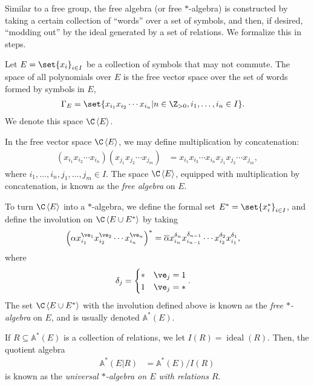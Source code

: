 Similar to a free group, the free algebra (or free $\ast$-algebra) is constructed by taking a certain collection of ``words'' over a set of symbols, and then, if desired, ``modding out'' by the ideal generated by a set of relations. We formalize this in steps.
\begin{definition}\label{def:free_algebra}
  Let $E=\set{x_i}_{i\in I}$ be a collection of symbols that may not commute. The space of all polynomials over $E$ is the free vector space over the set of words formed by symbols in $E$,
  \begin{align*}
    \Gamma_E &= \set{x_{i_1}x_{i_2}\cdots x_{i_n} | n\in\N,i_1,\dots,i_n\in I}.
  \end{align*}
  We denote this space $\C \left\langle E \right\rangle$.\newline

  In the free vector space $\C \left\langle E \right\rangle$, we may define multiplication by concatenation:
  \begin{align*}
    \left(x_{i_1}x_{i_2}\cdots x_{i_n}\right)\left(x_{j_1}x_{j_2}\cdots x_{j_m}\right) &= x_{i_1}x_{i_2}\cdots x_{i_n}x_{j_1}x_{j_2}\cdots x_{j_m},
  \end{align*}
  where $i_1,\dots,i_n,j_1,\dots,j_m\in I$. The space $\C\left\langle E \right\rangle$, equipped with multiplication by concatenation, is known as the \textit{free algebra} on $E$.\newline

  To turn $\C\left\langle E \right\rangle$ into a $\ast$-algebra, we define the formal set $E^{\ast} = \set{x_{i}^{\ast}}_{i\in I}$, and define the involution on $\C\left\langle E\cup E^{\ast} \right\rangle$ by taking
  \begin{align*}
    \left(\alpha x_{i_1}^{\ve_1}x_{i_2}^{\ve_2}\cdots x_{i_n}^{\ve_n}\right)^{\ast} &= \overline{\alpha}x_{i_n}^{\delta_n}x_{i_{n-1}}^{\delta_{n-1}}\cdots x_{i_2}^{\delta_2}x_{i_1}^{\delta_1},
  \end{align*}
  where
  \begin{align*}
    \delta_j &= \begin{cases}
      \ast & \ve_j = 1\\
      1 & \ve_j = \ast
    \end{cases}.
  \end{align*}
  The set $\C\left\langle E\cup E^{\ast} \right\rangle$ with the involution defined above is known as the \textit{free $\ast$-algebra} on $E$, and is usually denoted $\mathbb{A}^{\ast}\left(E\right)$.\newline

  If $R\subseteq \mathbb{A}^{\ast}\left(E\right)$ is a collection of relations, we let $I(R) = \operatorname{ideal}\left(R\right)$. Then, the quotient algebra
  \begin{align*}
    \mathbb{A}^{\ast}\left(E|R\right) &= \mathbb{A}^{\ast}\left(E\right)/I(R)
  \end{align*}
  is known as the \textit{universal $\ast$-algebra on $E$ with relations $R$}.
\end{definition}
